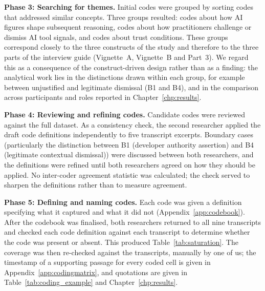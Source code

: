 \documentclass[a4paper,twoside]{bth}
\begin{document}
\textbf{Phase 3: Searching for themes.} Initial codes were grouped by sorting codes that addressed similar concepts. Three groups resulted: codes about how AI figures shape subsequent reasoning, codes about how practitioners challenge or dismiss AI tool signals, and codes about trust conditions. These groups correspond closely to the three constructs of the study and therefore to the three parts of the interview guide (Vignette~A, Vignette~B and Part~3). We regard this as a consequence of the construct-driven design rather than as a finding: the analytical work lies in the distinctions drawn within each group, for example between unjustified and legitimate dismissal (B1 and B4), and in the comparison across participants and roles reported in Chapter~\ref{chp:results}.

\textbf{Phase 4: Reviewing and refining codes.} Candidate codes were reviewed against the full dataset. As a consistency check, the second researcher applied the draft code definitions independently to five transcript excerpts. Boundary cases (particularly the distinction between B1 (developer authority assertion) and B4 (legitimate contextual dismissal)) were discussed between both researchers, and the definitions were refined until both researchers agreed on how they should be applied. No inter-coder agreement statistic was calculated; the check served to sharpen the definitions rather than to measure agreement.

\textbf{Phase 5: Defining and naming codes.} Each code was given a definition specifying what it captured and what it did not (Appendix~\ref{app:codebook}). After the codebook was finalised, both researchers returned to all nine transcripts and checked each code definition against each transcript to determine whether the code was present or absent. This produced Table~\ref{tab:saturation}. The coverage was then re-checked against the transcripts, manually by one of us; the timestamp of a supporting passage for every coded cell is given in Appendix~\ref{app:codingmatrix}, and quotations are given in Table~\ref{tab:coding_example} and Chapter~\ref{chp:results}.
\end{document}
